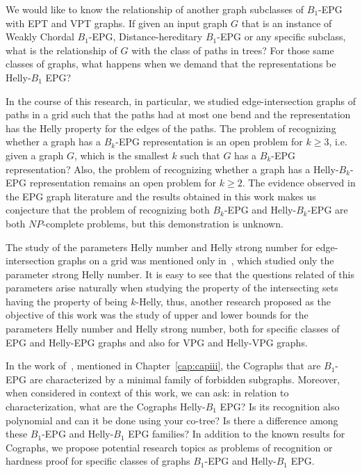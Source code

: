 We would like to know the relationship of another graph subclasses of $B_1$-EPG with EPT and VPT graphs. If given an input graph $G$ that is an instance of Weakly Chordal $B_1$-EPG,  Distance-hereditary $B_1$-EPG or any specific subclass, what is the relationship of $G$ with the class of paths in trees? For those same classes of graphs, what happens when we demand that the representations be Helly-$B_1$ EPG?

In the course of this research, in particular, we studied edge-intersection graphs of paths in a grid such that the paths had at most one bend and the representation has the Helly property for the edges of the paths. The problem of recognizing whether a graph has a  $B_{k}$-EPG representation is an open problem for $k\geq 3$, i.e. given a graph $ G$, which is the smallest $k$ such that $ G $ has a $ B_{k}$-EPG representation? Also, the problem of recognizing whether a graph has a  Helly-$B_{k}$-EPG representation remains an open problem for $ k\geq 2$. The evidence observed in the EPG graph literature and the results obtained in this work makes us conjecture that the problem of recognizing both $B_{k}$-EPG and Helly-$B_{k}$-EPG  are both $NP$-complete problems, but this demonstration is unknown.

The study of the parameters Helly number and Helly strong number for edge-intersection graphs on a grid was mentioned only in~\cite{golumbic2009, golumbic2013}, which studied only the parameter strong Helly number. It is easy to see that the questions related of this parameters arise naturally when studying the property of the intersecting sets having the property of being $k$-Helly, thus, another research proposed as the objective of this work was the study of upper and lower bounds for the parameters Helly number and Helly strong number, both for specific classes of EPG and Helly-EPG graphs and also for VPG and Helly-VPG graphs.

In the work of~\citet{cohen2014}, mentioned in Chapter~\ref{cap:capiii}, the Cographs that are $B_1$-EPG are characterized by a minimal family of forbidden subgraphs. Moreover, when considered in context of this work, we can ask: in relation to characterization, what are the Cographs Helly-$B_1$  EPG? Is its recognition also polynomial and can it be done using your co-tree? Is there a difference among these $B_1$-EPG and Helly-$B_1$  EPG families? In addition to the known results for Cographs, we propose potential research topics as problems of recognition or hardness proof  for specific classes of graphs $B_1$-EPG and Helly-$B_1$ EPG.


